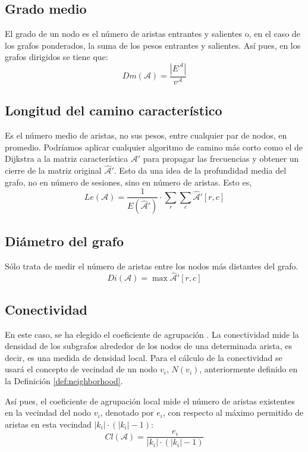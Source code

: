 \subsection{Grado medio}
El grado de un nodo es el número de aristas entrantes y salientes o, en el caso de los grafos ponderados, la suma de los pesos entrantes y salientes. Así pues, en los grafos dirigidos se tiene que:
\begin{equation}
Dm(\mathcal{A}) = \frac{|E^{\mathcal{A}}|}{v^{\mathcal{A}}}
\end{equation}
\subsection{Longitud del camino característico}
Es el número medio de aristas, no sus pesos, entre cualquier par de nodos, en promedio. Podríamos aplicar cualquier algoritmo de camino más corto como el de Dijkstra \cite{cormen2022introduction} a la matriz característica $\mathcal{A}'$ para propagar las frecuencias y obtener un cierre de la matriz original $\hat{\mathcal{A}}'$. Esto da una idea de la profundidad media del grafo, no en número de sesiones, sino en número de aristas. Esto es,
\begin{equation}
Le(\mathcal{A}) = \frac{1}{E(\hat{\mathcal{A}}')} \cdot \sum_r \sum_c \hat{\mathcal{A}}'[r,c]
\end{equation}
\subsection{Diámetro del grafo}
Sólo trata de medir el número de aristas entre los nodos más distantes del grafo.
\begin{equation}
Di(\mathcal{A}) = \max{\hat{\mathcal{A}}'[r,c]}
\end{equation}
\subsection{Conectividad}
En este caso, se ha elegido el coeficiente de agrupación \cite{cormen2022introduction}. La conectividad mide la densidad de los subgrafos alrededor de los nodos de una determinada arista, es decir, es una medida de densidad local. Para el cálculo de la conectividad se usará el concepto de vecindad de un nodo $v_i$, $N(v_i)$, anteriormente definido en la Definición \ref{def:neighborhood}.

Así pues, el coeficiente de agrupación local mide el número de aristas existentes en la vecindad del nodo $v_i$, denotado por $e_i$, con respecto al máximo permitido de aristas en esta vecindad $|k_i| \cdot (|k_i| - 1)$:
\begin{equation}
Cl(\mathcal{A}) = \frac{e_i}{|k_i| \cdot (|k_i| - 1)}
\end{equation}
